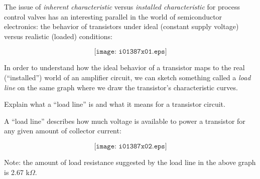 

The issue of {\it inherent characteristic} versus {\it installed characteristic} for process control valves has an interesting parallel in the world of semiconductor electronics: the behavior of transistors under ideal (constant supply voltage) versus realistic (loaded) conditions:

$$\texttt{[image: i01387x01.eps]}$$

In order to understand how the ideal behavior of a transistor maps to the real (``installed'') world of an amplifier circuit, we can sketch something called a {\it load line} on the same graph where we draw the transistor's characteristic curves.

Explain what a ``load line'' is and what it means for a transistor circuit.







A ``load line'' describes how much voltage is available to power a transistor for any given amount of collector current:
 
$$\texttt{[image: i01387x02.eps]}$$

\vskip 10pt

Note: the amount of load resistance suggested by the load line in the above graph is 2.67 k$\Omega$.











